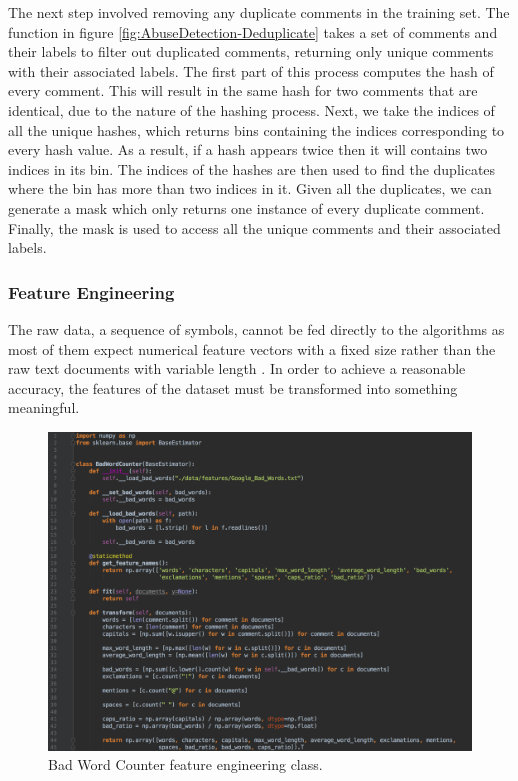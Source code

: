 The next step involved removing any duplicate comments in the training set. The function in figure \ref{fig:AbuseDetection-Deduplicate} takes a set of comments and their labels to filter out duplicated comments, returning only unique comments with their associated labels. The first part of this process computes the hash of every comment. This will result in the same hash for two comments that are identical, due to the nature of the hashing process. Next, we take the indices of all the unique hashes, which returns bins containing the indices corresponding to every hash value. As a result, if a hash appears twice then it will contains two indices in its bin. The indices of the hashes are then used to find the duplicates where the bin has more than two indices in it. Given all the duplicates, we can generate a mask which only returns one instance of every duplicate comment. Finally, the mask is used to access all the unique comments and their associated labels.

\subsubsection{Feature Engineering} \label{sec:feature-engineering}
The raw data, a sequence of symbols, cannot be fed directly to the algorithms as most of them expect numerical feature vectors with a fixed size rather than the raw text documents with variable length \cite{scikit:tfidf}. In order to achieve a reasonable accuracy, the features of the dataset must be transformed into something meaningful.

\begin{figure}[H]
	\centering
	\includegraphics[width=\textwidth]{Images/Implementation/DataProcessing/AbuseDetection/BadWordCounter}
	\caption{Bad Word Counter feature engineering class.}
	\label{fig:AbuseDetection-BadWordCounter}
\end{figure}

